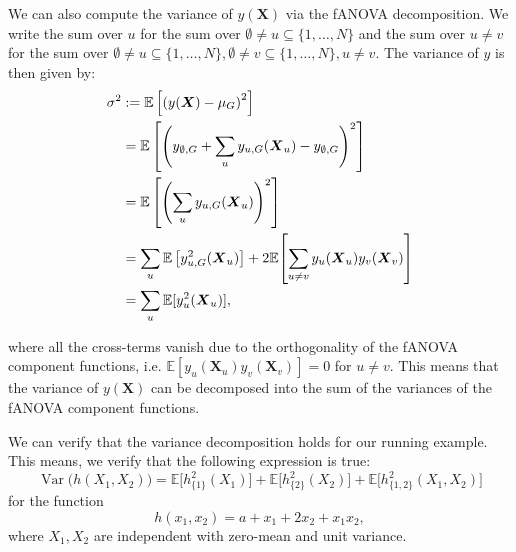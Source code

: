 We can also compute the variance of $y(\boldsymbol{X})$ via the fANOVA decomposition.
We write the sum over $u$ for the sum over $\emptyset \neq u \subseteq \{1, \dots, N\}$ and the sum over $u \neq v$ for the sum over $\emptyset \neq u \subseteq \{1, \dots, N\}, \emptyset \neq v \subseteq \{1, \dots, N\}, u \neq v$.
The variance of $y$ is then given by:
\begin{align}
\sigma^2 
&:= \mathbb{E}\left[ \left( y(\boldsymbol{X}) - \mu_G \right)^2 \right] \notag \\
&= \mathbb{E} \left[ \left( y_{\emptyset,G} + \sum_{u} y_{u,G}(\boldsymbol{X}_u) - y_{\emptyset,G} \right)^2 \right] \notag \\
&= \mathbb{E} \left[ \left( \sum_{u} y_{u,G}(\boldsymbol{X}_u) \right)^2 \right] \notag \\
&= \sum_{u} \mathbb{E} \left[ y_{u,G}^2(\boldsymbol{X}_u) \right]
+ 2 \mathbb{E}\!\left[\sum_{u \neq v} y_u({\boldsymbol{X}_u})  y_v({\boldsymbol{X}_v})\right]
\label{eq:variance_expansion} \\ 
& = \sum_{u} \mathbb{E}[y_u^2({\boldsymbol{X}_u})], \notag
\end{align}

where all the cross-terms vanish due to the orthogonality of the fANOVA component functions, i.e. $\mathbb{E}[y_u({\boldsymbol{X}_u})  y_v({\boldsymbol{X}_v})] = 0$ for $u \neq v$.
This means that the variance of $y(\boldsymbol{X})$ can be decomposed into the sum of the variances of the fANOVA component functions.\par

We can verify that the variance decomposition holds for our running example. This means, we verify that the following expression is true:
\[
  \operatorname{Var}\big(h(X_1,X_2)\big)
  = \mathbb{E}\big[h_{\{1\}}^2(X_1)\big]
  + \mathbb{E}\big[h_{\{2\}}^2(X_2)\big]
  + \mathbb{E}\big[h_{\{1,2\}}^2(X_1,X_2)\big]
\]
for the function
\[
  h(x_1,x_2) = a + x_1 + 2x_2 + x_1 x_2 ,
\]
where $X_1,X_2$ are independent with zero-mean and unit variance.

